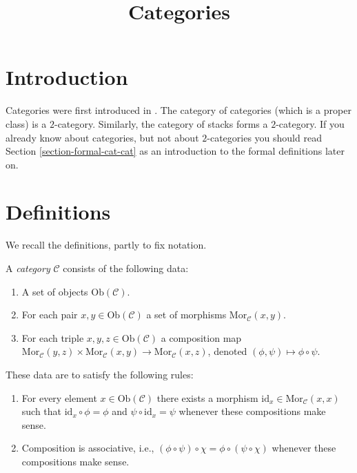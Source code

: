 


%


\title{Categories}


\maketitle

\label{section-phantom}

\tableofcontents

\section{Introduction}
\label{section-introduction}

\noindent
Categories were first introduced in \cite{GenEqui}.
The category of categories (which is a proper class)
is a $2$-category. Similarly, the category of stacks
forms a $2$-category. If you already know
about categories, but not about $2$-categories you
should read
Section \ref{section-formal-cat-cat}
as an introduction to the formal definitions later on.

\section{Definitions}
\label{section-definition-categories}

\noindent
We recall the definitions, partly to fix notation.

\begin{definition}
\label{definition-category}
A {\it category} $\mathcal{C}$ consists of the following data:
\begin{enumerate}
\item A set of objects $\text{Ob}(\mathcal{C})$.
\item For each pair $x, y \in \text{Ob}(\mathcal{C})$ a set of morphisms
$\text{Mor}_\mathcal{C}(x, y)$.
\item For each triple $x, y, z\in \text{Ob}(\mathcal{C})$ a composition
map $ \text{Mor}_\mathcal{C}(y, z) \times \text{Mor}_\mathcal{C}(x, y)
\to \text{Mor}_\mathcal{C}(x, z) $, denoted $(\phi, \psi) \mapsto
\phi \circ \psi$.
\end{enumerate}
These data are to satisfy the following rules:
\begin{enumerate}
\item For every element $x\in \text{Ob}(\mathcal{C})$ there exists a
morphism $\text{id}_x\in \text{Mor}_\mathcal{C}(x, x)$ such that
$\text{id}_x \circ \phi = \phi$ and $\psi \circ \text{id}_x = \psi $ whenever
these compositions make sense.
\item Composition is associative, i.e., $(\phi \circ \psi) \circ \chi =
\phi \circ ( \psi \circ \chi)$ whenever these compositions make sense.
\end{enumerate}
\end{definition}

